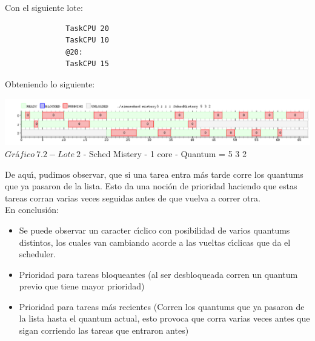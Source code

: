 Con el siguiente lote:\\

\begin{verbatim}
              TaskCPU 20
              TaskCPU 10
              @20:
              TaskCPU 15
\end{verbatim}

Obteniendo lo siguiente:\\
\begin{center}
    	\includegraphics[width=450pt]{./Test/ej7_3.png}
	{$Gr$\'a$fico \ 7.2 - Lote \ 2$ - Sched Mistery - 1 core - Quantum = 5 3 2}	
 \end{center}
 
De aqu\'{\i}, pudimos observar, que si una tarea entra m\'{a}s tarde corre los quantums que ya pasaron de la lista. Esto da 
una noci\'{o}n de prioridad haciendo que estas tareas corran varias veces seguidas antes de que vuelva a correr otra.\\

\indent En conclusi\'on:\\


\begin{itemize}
 \item Se puede observar un caracter c\'{\i}clico con posibilidad de varios quantums distintos, los cuales van cambiando
 acorde a las vueltas c\'{\i}clicas que da el scheduler.
 \item Prioridad para tareas bloqueantes (al ser desbloqueada corren un quantum previo que tiene mayor prioridad)
 \item Prioridad para tareas m\'as recientes (Corren los quantums que ya pasaron de la lista hasta el quantum actual, esto 
 provoca que corra varias veces antes que sigan corriendo las tareas que entraron antes)
\end{itemize}

